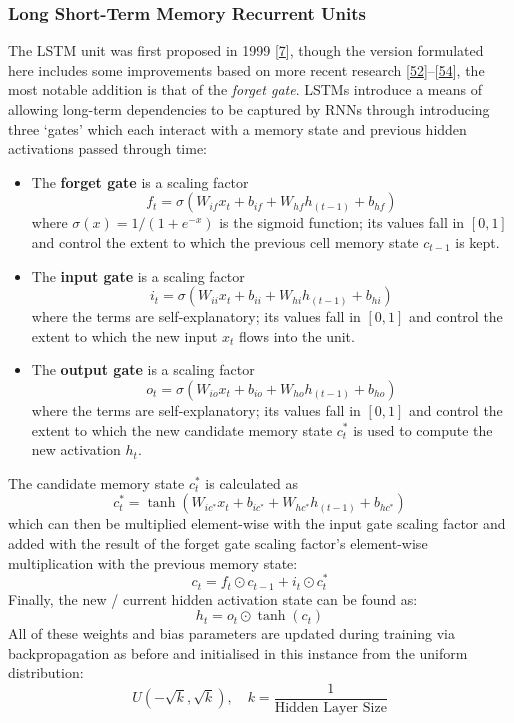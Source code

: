 \documentclass[12pt,]{article}
\providecommand{\tightlist}{%
  \setlength{\itemsep}{0pt}\setlength{\parskip}{0pt}}
\begin{document}
\hypertarget{long-short-term-memory-recurrent-units}{%
\subsubsection{Long Short-Term Memory Recurrent
Units}\label{long-short-term-memory-recurrent-units}}

The LSTM unit was first proposed in 1999
{[}\protect\hyperlink{ref-gers1999learning}{7}{]}, though the version
formulated here includes some improvements based on more recent research
{[}\protect\hyperlink{ref-sak2014long}{52}{]}--{[}\protect\hyperlink{ref-zebin2018human}{54}{]},
the most notable addition is that of the \emph{forget gate}. LSTMs
introduce a means of allowing long-term dependencies to be captured by
RNNs through introducing three `gates' which each interact with a memory
state and previous hidden activations passed through time:

\begin{itemize}
\tightlist
\item
  The \textbf{forget gate} is a scaling factor
  \[f_t = \sigma(W_{if} x_t + b_{if} + W_{hf} h_{(t-1)} + b_{hf})\]
  where \(\sigma(x) = 1 / (1 + e^{-x})\) is the sigmoid function; its
  values fall in \([0,1]\) and control the extent to which the previous
  cell memory state \(c_{t-1}\) is kept.
\item
  The \textbf{input gate} is a scaling factor
  \[i_t = \sigma(W_{ii} x_t + b_{ii} + W_{hi} h_{(t-1)} + b_{hi})\]
  where the terms are self-explanatory; its values fall in \([0,1]\) and
  control the extent to which the new input \(x_t\) flows into the unit.
\item
  The \textbf{output gate} is a scaling factor
  \[o_t = \sigma(W_{io} x_t + b_{io} + W_{ho} h_{(t-1)} + b_{ho})\]
  where the terms are self-explanatory; its values fall in \([0,1]\) and
  control the extent to which the new candidate memory state \(c^*_t\)
  is used to compute the new activation \(h_t\).
\end{itemize}

The candidate memory state \(c^*_t\) is calculated as
\[c^*_t = \tanh(W_{ic^*} x_t + b_{ic^*} + W_{hc^*} h_{(t-1)} + b_{hc^*})\]
which can then be multiplied element-wise with the input gate scaling
factor and added with the result of the forget gate scaling factor's
element-wise multiplication with the previous memory state:
\[c_t = f_t \odot c_{t-1} + i_t \odot c^*_t\] Finally, the new / current
hidden activation state can be found as: \[h_t = o_t \odot \tanh(c_t)\]
All of these weights and bias parameters are updated during training via
backpropagation as before and initialised in this instance from the
uniform distribution:
\[U(-\sqrt{k}, \sqrt{k}),\quad k = \frac{1}{\text{Hidden Layer Size}}\]
\end{document}

